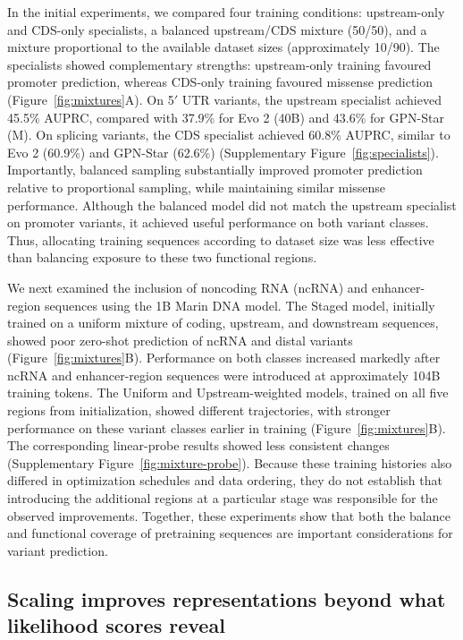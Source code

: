 \documentclass[a4paper,num-refs]{oup-contemporary}
\begin{document}
In the initial experiments, we compared four training conditions:
upstream-only and CDS-only specialists, a balanced upstream/CDS
mixture (50/50), and a mixture proportional to the available dataset
sizes (approximately 10/90). The specialists showed complementary
strengths: upstream-only training favoured promoter prediction,
whereas CDS-only training favoured missense prediction
(Figure~\ref{fig:mixtures}A). On 5$'$ UTR variants, the upstream
specialist achieved 45.5\% AUPRC, compared with 37.9\% for Evo 2 (40B)
and 43.6\% for GPN-Star (M). On splicing variants, the CDS specialist
achieved 60.8\% AUPRC, similar to Evo 2 (60.9\%) and GPN-Star (62.6\%)
(Supplementary Figure~\ref{fig:specialists}).
Importantly, balanced sampling substantially improved promoter
prediction relative to proportional sampling, while maintaining
similar missense performance. Although the balanced model did not
match the upstream specialist on promoter variants, it achieved
useful performance on both variant classes. Thus, allocating training
sequences according to dataset size was less effective than balancing
exposure to these two functional regions.

We next examined the inclusion of noncoding RNA (ncRNA) and
enhancer-region sequences using the 1B Marin DNA model.
The Staged model, initially trained on a uniform mixture of coding,
upstream, and downstream sequences, showed poor zero-shot prediction
of ncRNA and distal variants (Figure~\ref{fig:mixtures}B).
Performance on both classes increased
markedly after ncRNA and enhancer-region sequences were introduced
at approximately 104B training tokens.
The Uniform and Upstream-weighted models, trained on all five regions
from initialization, showed
different trajectories, with stronger performance on these variant
classes earlier in training (Figure~\ref{fig:mixtures}B).
The corresponding linear-probe results showed less consistent changes
(Supplementary Figure~\ref{fig:mixture-probe}).
Because these training histories also differed in optimization
schedules and data ordering, they do not establish that introducing
the additional regions at a particular stage was responsible for
the observed improvements. Together, these experiments show that
both the balance and functional coverage of pretraining sequences
are important considerations for variant prediction.


\subsection{Scaling improves representations beyond what likelihood scores
reveal}
\end{document}
